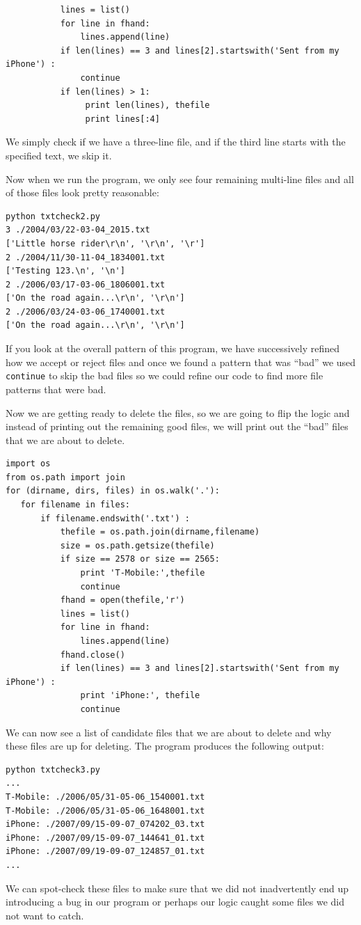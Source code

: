 \documentclass[10pt]{book}
\begin{document}
\beforeverb
\begin{verbatim}
           lines = list()
           for line in fhand:
               lines.append(line)
           if len(lines) == 3 and lines[2].startswith('Sent from my iPhone') :
               continue
           if len(lines) > 1:
                print len(lines), thefile
                print lines[:4]
\end{verbatim}
\afterverb
%
We simply check if we have a three-line file, and if the third 
line starts with the specified text, we skip it.

Now when we run the program, we only see four remaining 
multi-line files and all of those files look pretty reasonable:
\beforeverb
\begin{verbatim}
python txtcheck2.py 
3 ./2004/03/22-03-04_2015.txt
['Little horse rider\r\n', '\r\n', '\r']
2 ./2004/11/30-11-04_1834001.txt
['Testing 123.\n', '\n']
2 ./2006/03/17-03-06_1806001.txt
['On the road again...\r\n', '\r\n']
2 ./2006/03/24-03-06_1740001.txt
['On the road again...\r\n', '\r\n']
\end{verbatim}
\afterverb
%
If you look at the overall pattern of this program,
we have successively refined how we accept or reject
files and once we found a pattern that was ``bad'' we used
{\tt continue} to skip the bad files so we could refine
our code to find more file patterns that were bad.

Now we are getting ready to delete the files, so 
we are going to flip the logic and instead of printing out 
the remaining good files, we will print out the ``bad''
files that we are about to delete.
\beforeverb
\begin{verbatim}
import os
from os.path import join
for (dirname, dirs, files) in os.walk('.'):
   for filename in files:
       if filename.endswith('.txt') :
           thefile = os.path.join(dirname,filename)
           size = os.path.getsize(thefile)
           if size == 2578 or size == 2565:
               print 'T-Mobile:',thefile
               continue
           fhand = open(thefile,'r')
           lines = list()
           for line in fhand:
               lines.append(line)
           fhand.close()
           if len(lines) == 3 and lines[2].startswith('Sent from my iPhone') :
               print 'iPhone:', thefile
               continue
\end{verbatim}
\afterverb
%
We can now see a list of candidate files that we are about
to delete and why these files are up for deleting.
The program produces the following output:
\beforeverb
\begin{verbatim}
python txtcheck3.py
...
T-Mobile: ./2006/05/31-05-06_1540001.txt
T-Mobile: ./2006/05/31-05-06_1648001.txt
iPhone: ./2007/09/15-09-07_074202_03.txt
iPhone: ./2007/09/15-09-07_144641_01.txt
iPhone: ./2007/09/19-09-07_124857_01.txt
...
\end{verbatim}
\afterverb
%
We can spot-check these files to make sure that we did not inadvertently
end up introducing a bug in our program or perhaps our logic 
caught some files we did not want to catch.
\end{document}
